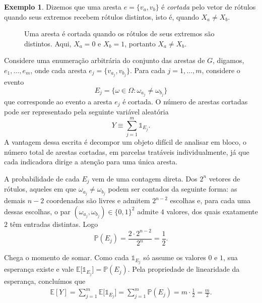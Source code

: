 \documentclass[12pt,portuguese]{article}
\theoremstyle{definition}
\newtheorem{example}[example]{Exemplo}
\begin{document}
\begin{example}
Dizemos que uma aresta $e=\{v_a,v_b\}$ é \emph{cortada} pelo vetor de rótulos
quando seus extremos recebem rótulos distintos, isto é, quando $X_a\neq X_b$.

\begin{figure}[H]
\centering
{}
\caption{Uma aresta é cortada quando os rótulos de seus extremos são
distintos. Aqui, $X_a=0$ e $X_b=1$, portanto $X_a\neq X_b$.}
\label{fig:aresta-cortada}
\end{figure}

Considere uma enumeração arbitrária do conjunto das
arestas de $G$, digamos, $e_1,\ldots,e_m$, onde cada aresta
$e_j=\{v_{a_j},v_{b_j}\}$. Para cada $j=1,\ldots, m$,  considere o evento
\[
E_j=\{\omega\in\Omega:\omega_{a_j}\neq\omega_{b_j}\}
\]
que corresponde ao evento a aresta $e_j$ é cortada. O número de arestas cortadas pode ser 
representado pela seguinte variável aleatória 
\[
Y\equiv \sum_{j=1}^m\mathds{1}_{E_j}.
\]
A vantagem dessa escrita é decompor um objeto difícil de analisar em bloco, o
número total de arestas cortadas, em parcelas tratáveis individualmente, já que cada
indicadora dirige a atenção para uma única aresta.

A probabilidade de cada $E_j$ vem de uma contagem direta. Dos $2^n$ vetores de
rótulos, aqueles em que $\omega_{a_j}\neq\omega_{b_j}$ podem ser contados da
seguinte forma: as demais $n-2$ coordenadas são livres e admitem $2^{n-2}$
escolhas e, para cada uma dessas escolhas, o par
$(\omega_{a_j},\omega_{b_j})\in\{0,1\}^2$ admite $4$ valores, dos quais
exatamente $2$ têm entradas distintas. Logo
\[
\mathbb{P}(E_j)
=\frac{2\cdot 2^{n-2}}{2^n}
=\frac{1}{2}.
\]

Chega o momento de somar. Como cada $\mathds{1}_{E_j}$ só assume os valores
$0$ e $1$, sua esperança existe e vale
$\mathbb{E}\bigl[\mathds{1}_{E_j}\bigr]=\mathbb{P}(E_j)$. Pela propriedade de linearidade
da esperança, concluímos que 
\begin{align*}
\mathbb{E}[Y]
=\sum_{j=1}^m\mathbb{E}\bigl[\mathds{1}_{E_j}\bigr]
=\sum_{j=1}^m\mathbb{P}(E_j)
=m\cdot\frac{1}{2}
=\frac{m}{2}.
\end{align*}


\end{example}
\end{document}
